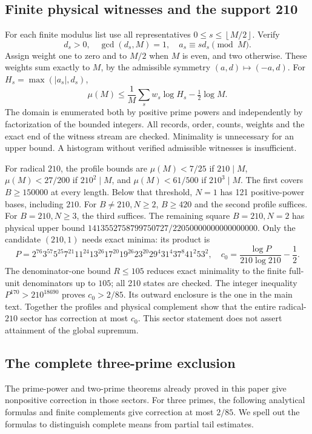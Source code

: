 \documentclass[11pt]{article}
\theoremstyle{definition}\newtheorem{definition}[theorem]{Definition}
\theoremstyle{remark}\newtheorem{remark}[theorem]{Remark}
\newcommand{\floor}[1]{\left\lfloor #1\right\rfloor}
\begin{document}
\subsection{Finite physical witnesses and the support 210}
For each finite modulus list use all representatives
\(0\le s\le\floor{M/2}\). Verify
\[
 d_s>0,\quad\gcd(d_s,M)=1,\quad a_s\equiv sd_s\pmod M .             \tag{E19}
\]
Assign weight one to zero and to \(M/2\) when \(M\) is even, and two
otherwise. These weights sum exactly to \(M\), by the admissible
symmetry \((a,d)\mapsto(-a,d)\). For \(H_s=\max(|a_s|,d_s)\),
\[
 \mu(M)\le\frac1M\sum_s w_s\log H_s-\tfrac12\log M .               \tag{E20}
\]
The domain is enumerated both by positive prime powers and independently
by factorization of the bounded integers. All records, order, counts,
weights and the exact end of the witness stream are checked.
Minimality is unnecessary for an upper bound. A histogram without
verified admissible witnesses is insufficient.

For radical \(210\), the profile bounds are
\(\mu(M)<7/25\) if \(210\mid M\),
\(\mu(M)<27/200\) if \(210^2\mid M\), and
\(\mu(M)<61/500\) if \(210^3\mid M\).
The first covers \(B\ge150000\) at every length. Below that threshold,
\(N=1\) has 121 positive-power bases, including \(210\).
For \(B\ne210,N\ge2\), \(B\ge420\) and the second profile suffices.
For \(B=210,N\ge3\), the third suffices. The remaining square
\(B=210,N=2\) has physical upper bound
\(1413552758799750727/22050000000000000000\).
Only the candidate \((210,1)\) needs exact minima: its product is
\[
 P=2^{76}3^{57}5^{25}7^{21}11^{24}13^{26}17^{20}19^{26}
       23^{20}29^4 31^4 37^8 41^2 53^2,
 \quad c_0=\frac{\log P}{210\log210}-\frac12 .                       \tag{E21}
\]
The denominator-one bound \(R\le105\) reduces exact minimality to
the finite full-unit denominators up to \(105\); all 210 states are
checked. The integer inequality \(P^{170}>210^{18690}\) proves
\(c_0>2/85\). Its outward enclosure is the one in the main text.
Together the profiles and physical complement show that the entire
radical-\(210\) sector has correction at most \(c_0\). This sector
statement does not assert attainment of the global supremum.

\subsection{The complete three-prime exclusion}
The prime-power and two-prime theorems already proved in this paper
give nonpositive correction in those sectors. For three primes, the
following analytical formulas and finite complements give correction
at most \(2/85\). We spell out the formulas to distinguish complete
means from partial tail estimates.
\end{document}

